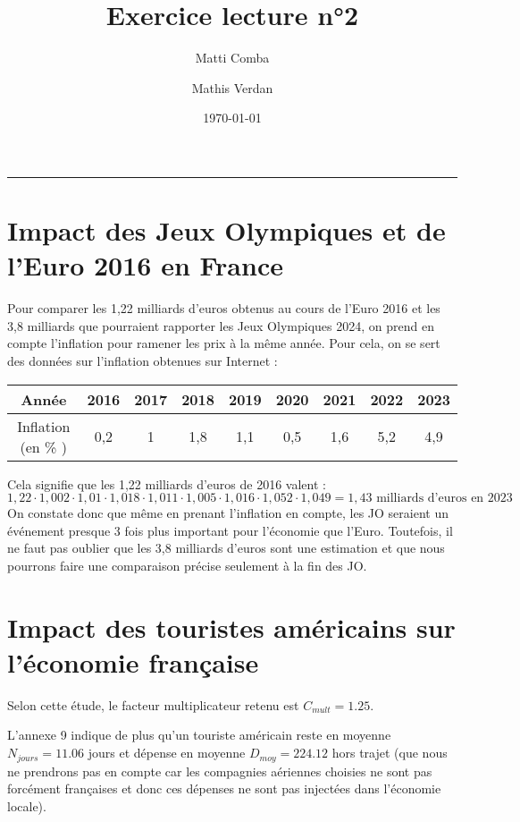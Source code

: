 \documentclass{article}
\title{Exercice lecture n°2}
\author{Matti Comba \and Mathis Verdan}
\date{\today}
\begin{document}
\maketitle
\begin{center}
  \rule{\linewidth}{0.5mm}
\end{center}


\section{Impact des Jeux Olympiques et de l'Euro 2016 en France}
Pour comparer les 1,22 milliards d'euros obtenus au cours de l'Euro 2016 et les 3,8 milliards que pourraient rapporter les Jeux Olympiques 2024, on prend en compte l'inflation pour ramener les prix à la même année. Pour cela, on se sert des données sur l'inflation obtenues sur Internet : 

\begin{center}
    \begin{tabular}{ | c | c | c |  c |  c |  c |  c |  c |  c | }
      \hline
      Année & 2016 & 2017 & 2018 & 2019 & 2020 & 2021 & 2022 & 2023 \\ \hline
      Inflation (en \% ) & 0,2 & 1 & 1,8 & 1,1 & 0,5 & 1,6 & 5,2 & 4,9 \\ \hline
    \end{tabular}
\end{center}

Cela signifie que les 1,22 milliards d'euros de 2016 valent :
$$ 1,22 \cdot 1,002 \cdot 1,01 \cdot 1,018 \cdot 1,011 \cdot 1,005 \cdot 1,016 \cdot 1,052 \cdot 1,049 = 1,43 \text{ milliards d'euros en 2023}$$
On constate donc que même en prenant l'inflation en compte, les JO seraient un événement presque 3 fois plus important pour l'économie que l'Euro. Toutefois, il ne faut pas oublier que les 3,8 milliards d'euros sont une estimation et que nous pourrons faire une comparaison précise seulement à la fin des JO.

\section{Impact des touristes américains sur l'économie française}
  
    Selon cette étude, le facteur multiplicateur retenu est $ C_{mult} = 1.25$. 
  
  L'annexe 9 indique de plus qu'un touriste américain reste en moyenne $N_{jours} = 11.06$ jours et dépense en moyenne $D_{moy}=224.12 $ \texteuro hors trajet (que nous ne prendrons pas en compte car les compagnies aériennes choisies ne sont pas forcément françaises et donc ces dépenses ne sont pas injectées dans l'économie locale).
\end{document}
